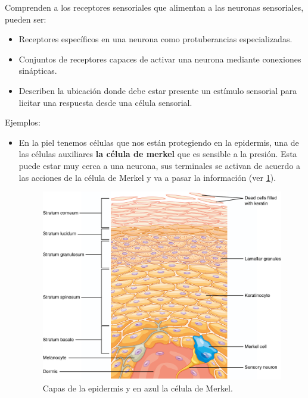 Comprenden a los receptores sensoriales que alimentan a las neuronas sensoriales, pueden ser:

\begin{itemize}
\item Receptores específicos en una neurona como protuberancias especializadas. 
\item Conjuntos de receptores capaces de activar una neurona mediante conexiones sinápticas. 
\item Describen la ubicación donde debe estar presente un estímulo sensorial para licitar una respuesta desde una célula sensorial. 
\end{itemize}

Ejemplos:

\begin{itemize}
\item En la piel tenemos células que nos están protegiendo en la epidermis, una de las células auxiliares \textbf{la célula de merkel} que es
sensible a la presión. Esta puede estar muy cerca a una neurona, sus terminales se activan de acuerdo a las acciones de la célula de Merkel y va a pasar la información (ver \ref{fig:mer}).  
 	
\begin{figure}[h]
 \centering
 \includegraphics[scale=0.2]{../Figuras/merkel.png}
 \caption{Capas de la epidermis y en azul la célula de Merkel.}
 \label{fig:mer}
\end{figure}


\end{itemize}
